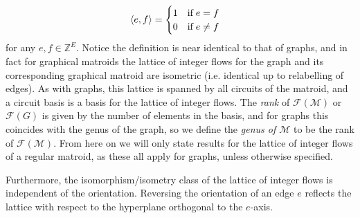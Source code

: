 \documentclass[12pt]{report}
\theoremstyle{definition}
\DeclarePairedDelimiter\iprod{\langle}{\rangle}
\def\Z{\mathbb Z}
\def\calF{\mathcal F}
\def\calM{\mathcal M}
\theoremstyle{upright}
\begin{document}
\[\iprod*{e, f}=\begin{cases}
    1\quad\text{if}\;e=f\\
    0\quad\text{if}\;e\neq f
\end{cases}\]
for any $e,f\in\Z^E$.
Notice the definition is near identical to that of graphs, and in fact for graphical matroids the lattice of integer flows for the graph and its corresponding graphical matroid are isometric (i.e. identical up to relabelling of edges).
As with graphs, this lattice is spanned by all circuits of the matroid, and a circuit basis is a basis for the lattice of integer flows.
The \textit{rank} of $\calF(\calM)$ or $\calF(G)$ is given by the number of elements in the basis, and for graphs this coincides with the genus of the graph, so we define the \textit{genus of $\calM$} to be the rank of $\calF(\calM)$.
From here on we will only state results for the lattice of integer flows of a regular matroid, as these all apply for graphs, unless otherwise specified.

Furthermore, the isomorphism/isometry class of the lattice of integer flows is independent of the orientation.
Reversing the orientation of an edge $e$ reflects the lattice with respect to the hyperplane orthogonal to the $e$-axis.
\end{document}
